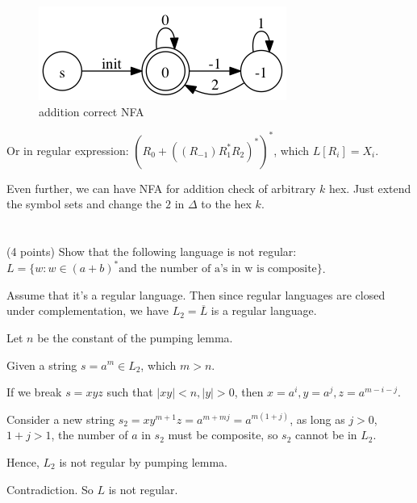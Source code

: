 \documentclass[paper=a4, fontsize=11pt]{scrartcl} %
\begin{document}
\begin{figure}[hp]
  \centering
  \includegraphics[width=.4\textwidth]{1-4.gv.png}
  \caption{addition correct NFA}
\end{figure}

Or in regular expression: $(R_{0}+((R_{-1})R_{1}^*R_{2})^*)^*$, which
$L[R_i] = X_i$.

Even further, we can have NFA for addition check of arbitrary $k$ hex.
Just extend the symbol sets and change the $2$ in $\Delta$ to the hex $k$.


\section{}

\begin{fancyquotes}
  (4 points) Show that the following language is not regular: $L = \{w
  : w \in (a + b)^* \text{and the number of a's in w is composite}\}$.
\end{fancyquotes}

Assume that it's a regular language.
Then since regular languages are closed under complementation,
we have $L_2 = \overline{L}$ is a regular language.

Let $n$ be the constant of the pumping lemma.

Given a string $s = a^{m} \in L_2$, which $m>n$.

If we break $s = xyz$ such that $|xy|<n, |y|>0$, then
$x = a^i, y = a^j, z = a^{m-i-j}$.

Consider a new string $s_2 = xy^{m+1}z = a^{m+mj} = a^{m(1+j)}$,
as long as $j>0$, $1+j>1$, the number of $a$ in $s_2$ must be
composite, so $s_2$ cannot be in $L_2$.

Hence, $L_2$ is not regular by pumping lemma.

Contradiction. So $L$ is not regular.
\end{document}
